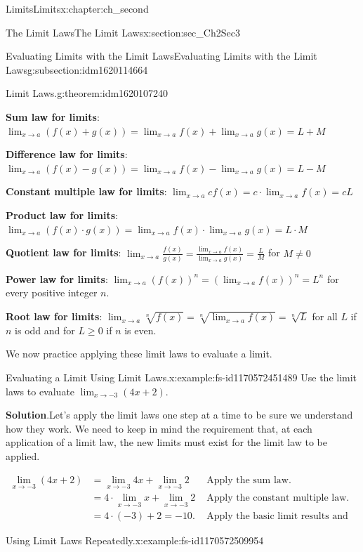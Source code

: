\documentclass[oneside,10pt,]{book}
\newcommand{\blocktitlefont}{\relax}
\newcommand{\terminology}[1]{\textbf{#1}}
\numberwithin{equation}{section}
\newcommand{\amp}{&}
\begin{document}
\begin{chapterptx}{Limits}{}{Limits}{}{}{x:chapter:ch_second}
\begin{sectionptx}{The Limit Laws}{}{The Limit Laws}{}{}{x:section:sec_Ch2Sec3}
\begin{subsectionptx}{Evaluating Limits with the Limit Laws}{}{Evaluating Limits with the Limit Laws}{}{}{g:subsection:idm1620114664}
\begin{theorem}{Limit Laws.}{}{g:theorem:idm1620107240}
\par
\terminology{Sum law for limits}: \(\lim_{x \to a }(f(x)+g(x))=\lim_{x \to a }f(x)+\lim_{x \to a }g(x)=L+M\)%
\par
\terminology{Difference law for limits}: \(\lim_{x \to a }(f(x)-g(x))=\lim_{x \to a }f(x)-\lim_{x \to a }g(x)=L-M\)%
\par
\terminology{Constant multiple law for limits}: \(\lim_{x \to a }cf(x)=c\cdot \lim_{x \to a }f(x)=cL\)%
\par
\terminology{Product law for limits}: \(\lim_{x \to a }(f(x)\cdot g(x))=\lim_{x \to a }f(x)\cdot \lim_{x \to a }g(x)=L\cdot M\)%
\par
\terminology{Quotient law for limits}: \(\lim_{x \to a }\frac{f(x)}{g(x)}=\frac{\lim_{x \to a }f(x)}{\lim_{x \to a }g(x)}=\frac{L}{M}\) for \(M\neq 0\)%
\par
\terminology{Power law for limits}: \(\lim_{x \to a }(f(x))^n=(\lim_{x \to a }f(x))^n=L^n\) for every positive integer \(n\).%
\par
\terminology{Root law for limits}: \(\lim_{x \to a }\sqrt[n]{f(x)}=\sqrt[n]{\lim_{x \to a }f(x)}=\sqrt[n]{L}\) for all \(L\) if \(n\) is odd and for \(L\geq 0\) if \(n\) is even.%
\end{theorem}
We now practice applying these limit laws to evaluate a limit.%
\begin{example}{Evaluating a Limit Using Limit Laws.}{x:example:fs-id1170572451489}%
Use the limit laws to evaluate \(\lim_{x \to -3 }(4x+2).\)%
\par\smallskip%
\noindent\textbf{\blocktitlefont Solution}.\hypertarget{g:solution:idm1620092520}{}\quad{}Let’s apply the limit laws one step at a time to be sure we understand how they work. We need to keep in mind the requirement that, at each application of a limit law, the new limits must exist for the limit law to be applied.%
\par
%
\begin{align*}
\lim_{x \to -3 }(4x+2)    \amp=\lim_{x \to -3 }4x+\lim_{x \to -3 }2   \amp\text{ Apply the sum law. }\\
\amp=4\cdot \lim_{x \to -3 }x+\lim_{x \to -3 }2\amp\text{ Apply the constant multiple law. }\\
\amp=4\cdot (-3)+2=-10.                       \amp\text{ Apply the basic limit results and simplify. }
\end{align*}
%
\end{example}
\begin{example}{Using Limit Laws Repeatedly.}{x:example:fs-id1170572509954}%

\end{example}
\end{subsectionptx}
\end{sectionptx}
\end{chapterptx}
\end{document}
